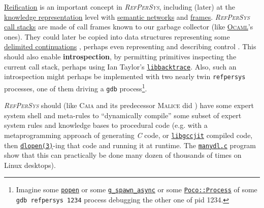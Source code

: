 \documentclass{IEEEtran}
\newcommand{\RefPerSys}{{\textit{\textsc{RefPerSys}}}}
\begin{document}
\href{https://en.wikipedia.org/wiki/Reification_(computer_science)}{Reification}
is an important concept in \RefPerSys, including (later) at the
\href{https://en.wikipedia.org/wiki/Knowledge_representation_and_reasoning}{knowledge
  representation} level with
\href{https://en.wikipedia.org/wiki/Semantic_network}{semantic
  networks} and
\href{https://en.wikipedia.org/wiki/Frame_(artificial_intelligence)}{frames}. {\RefPerSys}
\href{https://en.wikipedia.org/wiki/Call_stack}{call stacks} are made
of call frames known to our garbage collector (like
\href{https://caml.inria.fr/pub/docs/manual-ocaml/intfc.html}{\textsc{Ocaml}}'s
ones). They could later be copied into data structures representing
some
\href{https://en.wikipedia.org/wiki/Delimited_continuation}{delimited
  continuations} \cite{Reynolds:1993:continuations,
  Queinnec:2004:ContinWeb}, perhaps even representing and describing
control \cite{fouet-starynkevitch:describing-control:1987,
  Starynkevitch-1990-EUM, Pitrat:2009:ArtifBeings}. This should also
enable \textbf{introspection}, by permitting primitives inspecting the
current call stack, perhaps using Ian Taylor's
\href{https://github.com/ianlancetaylor/libbacktrace}{\texttt{libbacktrace}}. Also,
such an introspection might perhaps be implemented \cite{mitchell:2001:alp} with two nearly
twin \texttt{refpersys} processes, one of them driving a \texttt{gdb}
process\footnote{Imagine some
\href{http://man7.org/linux/man-pages/man3/popen.3.html}{\texttt{popen}}
or some
\href{https://developer.gnome.org/glib/stable/glib-Spawning-Processes.html\#g-spawn-async}{\texttt{g\_spawn\_async}}
or some
\href{https://pocoproject.org/docs/Poco.Process.html}{\texttt{Poco::Process}}
of some \texttt{gdb refpersys 1234} process debugging the other one of
pid 1234.}.

{\RefPerSys} should (like \textsc{Caia} and its predecessor
\textsc{Malice} did
\cite{Pitrat:2009:AST,Pitrat:1996:FGCS,Pitrat:2009:ArtifBeings}) have
some expert system shell \cite{kumar:2015:importance-expert-systems,
  nigro:2008:meta} and meta-rules to ``dynamically compile'' some
subset of expert system rules and knowledge bases to procedural code
(e.g. with a metaprogramming approach of generating \emph{C} code, or
\href{https://gcc.gnu.org/onlinedocs/jit/}{\texttt{libgccjit}}
compiled code, then
\href{http://man7.org/linux/man-pages/man3/dlopen.3.html}{\texttt{dlopen(3)}}-ing
that code and running it at runtime. The
\href{https://github.com/bstarynk/misc-basile/blob/master/manydl.c}{\texttt{manydl.c}}
program show that this can practically be done many dozen of thousands
of times on Linux desktops).
\end{document}
